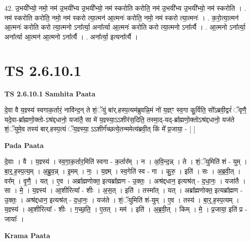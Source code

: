 \documentclass[17pt]{extarticle}
\begin{document}
42. उ॒भयी᳚भ्यो॒ नमो॒ नम॑ उ॒भयी᳚भ्य उ॒भयी᳚भ्यो॒ नम॑ स्करोति करोति॒ नम॑ उ॒भयी᳚भ्य उ॒भयी᳚भ्यो॒ नम॑ स्करोति । . नम॑ स्करोति करोति॒ नमो॒ नम॑ स्करो त्या॒त्मन॑ आ॒त्मनः॑ करोति॒ नमो॒ नम॑ स्करो त्या॒त्मनः॑ । . क॒रो॒त्या॒त्मन॑ आ॒त्मनः॑ करोति करो त्या॒त्मनो ऽना᳚र्त्या॒ अना᳚र्त्या आ॒त्मनः॑ करोति करो त्या॒त्मनो ऽना᳚र्त्यै । . आ॒त्मनो ऽना᳚र्त्या॒ अना᳚र्त्या आ॒त्मन॑ आ॒त्मनो ऽना᳚र्त्यै । . अना᳚र्त्या॒ इत्यना᳚र्त्यै । \newline
\pagebreak
{}
\section*{ TS 2.6.10.1 }

\textbf{TS 2.6.10.1 } \newline
\textbf{Samhita Paata} \newline

दे॒वा वै य॒ज्ञ्स्य॑ स्वगाक॒र्तारं॒ नावि॑न्द॒न् ते शं॒ॅयुं बा॑र्.हस्प॒त्यम॑ब्रुवन्नि॒मं नो॑ य॒ज्ञ्ꣳ स्व॒गा कु॒र्विति॒ सो᳚ऽब्रवी॒द्वरं॑ ॅवृणै॒ यदे॒वा-ब्रा᳚ह्मणो॒क्तो-ऽश्र॑द्दधानो॒ यजा॑तै॒ सा मे॑ य॒ज्ञ्स्या॒ऽऽशीर॑स॒दिति॒ तस्मा॒द्-यद्-ब्रा᳚ह्मणो॒क्तोऽश्र॑द्दधानो॒ यज॑ते शं॒ॅयुमे॒व तस्य॑ बार्.हस्प॒त्यं ॅय॒ज्ञ्स्या॒ ऽऽशीर्ग॑च्छत्ये॒तन्ममेत्य॑ब्रवी॒त् किं मे᳚ प्र॒जाया॒ - [  ] \newline

\textbf{Pada Paata} \newline

दे॒वाः । वै । य॒ज्ञ्स्य॑ । स्व॒गा॒क॒र्तार॒मिति॑ स्वगा - क॒र्तार᳚म् । न । अ॒वि॒न्द॒न्न् । ते । शं॒ॅयुमिति॑ शं - युम् । बा॒र्॒.ह॒स्प॒त्य॒म् । अ॒ब्रु॒व॒न्न् । इ॒मम् । नः॒ । य॒ज्ञ्म् । स्व॒गेति॑ स्व - गा । कु॒रु॒ । इति॑ । सः । अ॒ब्र॒वी॒त् । वर᳚म् । वृ॒णै॒ । यत् । ए॒व । अब्रा᳚ह्मणोक्त॒ इत्यब्रा᳚ह्मण - उ॒क्तः॒ । अश्र॑द्दधान॒ इत्यश्र॑त् - द॒धा॒नः॒ । यजा॑तै । सा । मे॒ । य॒ज्ञ्स्य॑ । आ॒शीरित्या᳚ - शीः । अ॒स॒त् । इति॑ । तस्मा᳚त् । यत् । अब्रा᳚ह्मणोक्त॒ इत्यब्रा᳚ह्मण - उ॒क्तः॒ । अश्र॑द्दधान॒ इत्यश्र॑त् - द॒धा॒नः॒ । यज॑ते । शं॒ॅयुमिति॑ शं-युम् । ए॒व । तस्य॑ । बा॒र्॒.ह॒स्प॒त्यम् । य॒ज्ञ्स्य॑ । आ॒शीरित्या᳚ - शीः । ग॒च्छ॒ति॒ । ए॒तत् । मम॑ । इति॑ । अ॒ब्र॒वी॒त् । किम् । मे॒ । प्र॒जाया॒ इति॑ प्र - जायाः᳚ ।  \newline


\textbf{Krama Paata} \newline
\end{document}
